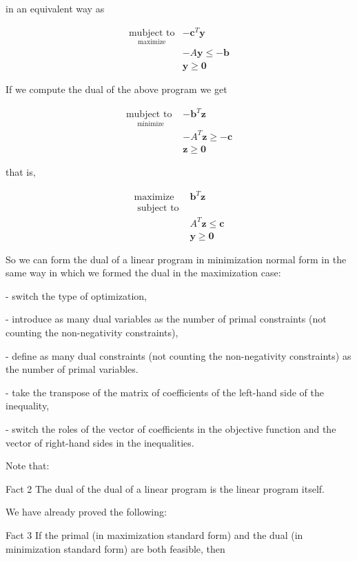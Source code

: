 in an equivalent way as

$$
\begin{array}{ll}
\underset{\operatorname{maximize}}{\operatorname{mubject~to}} & -\mathbf{c}^{T} \mathbf{y} \\
& -A \mathbf{y} \leq-\mathbf{b} \\
& \mathbf{y} \geq \mathbf{0}
\end{array}
$$

If we compute the dual of the above program we get

$$
\begin{array}{ll}
\underset{\text { minimize }}{\operatorname{mubject} \text { to }} & -\mathbf{b}^{T} \mathbf{z} \\
& -A^{T} \mathbf{z} \geq-\mathbf{c} \\
& \mathbf{z} \geq \mathbf{0}
\end{array}
$$

that is,

$$
\begin{array}{ll}
\operatorname{maximize} & \mathbf{b}^{T} \mathbf{z} \\
\text { subject to } & \\
& A^{T} \mathbf{z} \leq \mathbf{c} \\
& \mathbf{y} \geq \mathbf{0}
\end{array}
$$

So we can form the dual of a linear program in minimization normal form in the same way in which we formed the dual in the maximization case:

- switch the type of optimization,

- introduce as many dual variables as the number of primal constraints (not counting the non-negativity constraints),

- define as many dual constraints (not counting the non-negativity constraints) as the number of primal variables.

- take the transpose of the matrix of coefficients of the left-hand side of the inequality,

- switch the roles of the vector of coefficients in the objective function and the vector of right-hand sides in the inequalities.

Note that:

Fact 2 The dual of the dual of a linear program is the linear program itself.

We have already proved the following:

Fact 3 If the primal (in maximization standard form) and the dual (in minimization standard form) are both feasible, then

